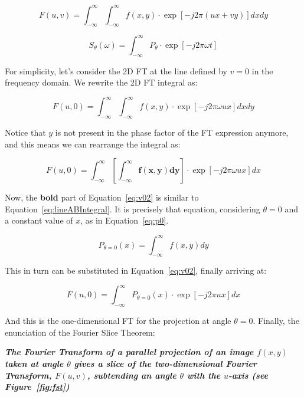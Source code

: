 \begin{equation}
    \label{eq:objectFT}
    F(u, v) = \int_{-\infty}^{\infty} \int_{-\infty}^{\infty} f(x, y)
    \cdot \exp \left [ -j2\pi (ux + vy) \right ] dx dy 
\end{equation}

\begin{equation}
    \label{eq:1dFTproj}
    S_{\theta}(\omega) = \int_{-\infty}^{\infty} P_{\theta} \cdot \exp\left[
    -j2 \pi \omega t \right]
\end{equation}

For simplicity, let's consider the 2D \gls{FT} at the line defined by
$v=0$ in the frequency domain. We rewrite the 2D \gls{FT} integral as:

\begin{equation}
    \label{eq:v0}
    F(u, 0) = \int_{-\infty}^{\infty} \int_{-\infty}^{\infty} f(x, y)
    \cdot \exp \left[  -j 2\pi  \omega ux \right] dx dy
\end{equation}

Notice that $y$ is not present in the phase factor of the \gls{FT}
expression anymore, and this means we can rearrange the integral as:

\begin{equation}
    \label{eq:v02}
    F(u, 0) = \int_{-\infty}^{\infty} \left[ \mathbf{\int_{-\infty}^{\infty}
    f(x, y) dy }\right] \cdot \exp \left[  -j 2\pi  \omega ux \right] dx 
\end{equation}

Now, the \textbf{bold} part of Equation~\ref{eq:v02} is similar to
Equation~\ref{eq:lineABIntegral}. It is precisely that equation,
considering $\theta=0$ and a constant value of $x$, as in
Equation~\ref{eq:p0}.

\begin{equation}
    \label{eq:p0}
    P_{\theta=0} (x) = \int_{-\infty}^{\infty} f(x, y) dy
\end{equation}

This in turn can be substituted in Equation~\ref{eq:v02}, finally
arriving at:

\begin{equation}
    \label{eq:FTP}
    F(u, 0) = \int_{-\infty}^{\infty} P_{\theta=0} (x) \cdot \exp \left[
    -j 2\pi ux \right] dx
\end{equation}

And this is the one-dimensional \gls{FT} for the projection at angle
$\theta=0$. Finally, the enunciation of the Fourier Slice Theorem:
\begin{center}
    \begin{minipage}{0.8\textwidth}

        \noindent\textbf{\emph{The Fourier Transform of a parallel
                projection  of an image $f(x, y)$ taken at angle
                $\theta$ gives a slice of the two-dimensional Fourier
                Transform, $F(u, v)$, subtending an angle $\theta$ with
                the $u$-axis (see Figure~\ref{fig:fst})}}

    \end{minipage}
\end{center}

